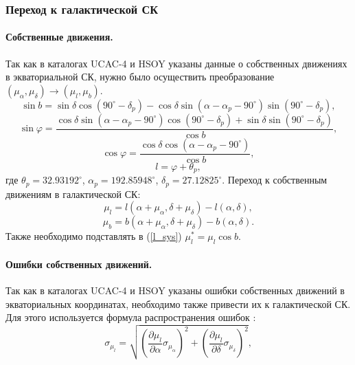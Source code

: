 \documentclass{matmex-diploma-custom}
\begin{document}
\subsubsection{Переход к галактической СК}
\par \paragraph{Собственные движения.} 
Так как в каталогах UCAC-4 и HSOY указаны данные о собственных движениях в экваториальной СК, нужно было осуществить преобразование $(\mu_{\alpha}, \mu_{\delta}) \rightarrow (\mu_l, \mu_b)$.
\begin{equation}
        \sin{b} = \sin{\delta} \cos(90^{\circ} - \delta_p) - \cos{\delta} \sin(\alpha - \alpha_p - 90^{\circ}) \sin(90^{\circ} - \delta_p),
\end{equation}
\begin{equation}
        \sin{\varphi} = \frac{\cos{\delta} \sin(\alpha - \alpha_p - 90^{\circ}) \cos(90^{\circ} - \delta_p) + \sin{\delta} \sin(90^{\circ} - \delta_p)}{\cos{b}},
\end{equation}
\begin{equation}
        \cos{\varphi} = \frac{ \cos{\delta} \cos(\alpha - \alpha_p - 90^{\circ})}{\cos{b}},
\end{equation}
\begin{equation}
        l = \varphi + \theta_p,
\end{equation}
где $\theta_p = 32.93192^{\circ}$, $\alpha_p = 192.85948^{\circ}$, $\delta_p = 27.12825^{\circ}$. Переход к собственным движениям в галактической СК:
\begin{equation}
        \mu_l = l(\alpha + \mu_{\alpha}, \delta + \mu_{\delta}) - l(\alpha, \delta),
\end{equation}
\begin{equation}
        \mu_b = b(\alpha + \mu_{\alpha}, \delta + \mu_{\delta}) - b(\alpha, \delta).
\end{equation}
Также необходимо подставлять в (\ref{l_sys}) $\mu_l^* = \mu_l \cos{b}$.

\par \paragraph{Ошибки собственных движений.} 
\par Так как в каталогах UCAC-4 и HSOY указаны ошибки собственных движений в экваториальных координатах, необходимо также привести их к галактической СК. Для этого используется формула распространения ошибок \cite{6}:
\begin{equation}
        \sigma_{\mu_l} = \sqrt{\left(\frac{\partial \mu_l}{\partial \alpha} \sigma_{\mu_{\alpha}} \right)^2 + \left(\frac{\partial \mu_l}{\partial\delta} \sigma_{\mu_{\delta}} \right)^2},
\end{equation}
\end{document}
